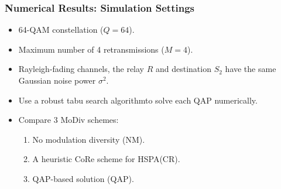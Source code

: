 \documentclass{beamer}
\begin{document}
\begin{frame}
  \frametitle{Numerical Results: Simulation Settings}
  \begin{itemize}[<+->]
    \item 64-QAM constellation ($Q = 64$).
    \item Maximum number of 4 retransmissions ($M = 4$).
    \item Rayleigh-fading channels, the relay $R$ and destination $S_2$ have the
    same Gaussian noise power $\sigma^2$.
    \item Use a robust tabu search algorithm\footnotemark to solve each QAP
    numerically.
    \item Compare 3 MoDiv schemes:
      \begin{enumerate}
        \item No modulation diversity (NM).
        \item A heuristic CoRe scheme for HSPA\footnotemark (CR).
        \item QAP-based solution (QAP).
      \end{enumerate}
  \end{itemize}
\end{frame}
\end{document}
